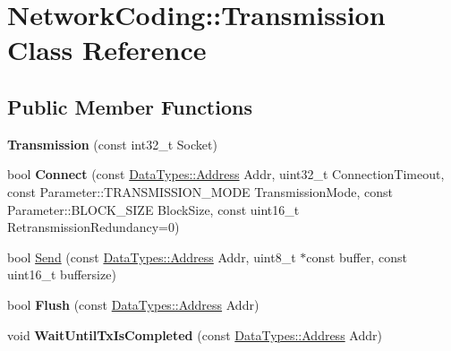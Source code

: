 \hypertarget{class_network_coding_1_1_transmission}{}\section{Network\+Coding\+:\+:Transmission Class Reference}
\label{class_network_coding_1_1_transmission}
\subsection*{Public Member Functions}
\begin{DoxyCompactItemize}
\item 
{\bfseries Transmission} (const int32\+\_\+t Socket)\hypertarget{class_network_coding_1_1_transmission_a0088c71d39d15bcbdeab5be97ca9c521}{}\label{class_network_coding_1_1_transmission_a0088c71d39d15bcbdeab5be97ca9c521}

\item 
bool {\bfseries Connect} (const \hyperlink{class_network_coding_1_1_data_types_1_1_address}{Data\+Types\+::\+Address} Addr, uint32\+\_\+t Connection\+Timeout, const Parameter\+::\+T\+R\+A\+N\+S\+M\+I\+S\+S\+I\+O\+N\+\_\+\+M\+O\+DE Transmission\+Mode, const Parameter\+::\+B\+L\+O\+C\+K\+\_\+\+S\+I\+ZE Block\+Size, const uint16\+\_\+t Retransmission\+Redundancy=0)\hypertarget{class_network_coding_1_1_transmission_acf7b8882079065561cf712db570f1a97}{}\label{class_network_coding_1_1_transmission_acf7b8882079065561cf712db570f1a97}

\item 
bool \hyperlink{class_network_coding_1_1_transmission_a374d54400d1a31f7d85119670d896aa8}{Send} (const \hyperlink{class_network_coding_1_1_data_types_1_1_address}{Data\+Types\+::\+Address} Addr, uint8\+\_\+t $\ast$const buffer, const uint16\+\_\+t buffersize)
\item 
bool {\bfseries Flush} (const \hyperlink{class_network_coding_1_1_data_types_1_1_address}{Data\+Types\+::\+Address} Addr)\hypertarget{class_network_coding_1_1_transmission_a4c843d9330d4c073e69ce82890012e6a}{}\label{class_network_coding_1_1_transmission_a4c843d9330d4c073e69ce82890012e6a}

\item 
void {\bfseries Wait\+Until\+Tx\+Is\+Completed} (const \hyperlink{class_network_coding_1_1_data_types_1_1_address}{Data\+Types\+::\+Address} Addr)\hypertarget{class_network_coding_1_1_transmission_a3b9dae872646600c26c7dd2864205d25}{}\label{class_network_coding_1_1_transmission_a3b9dae872646600c26c7dd2864205d25}


\end{DoxyCompactItemize}
